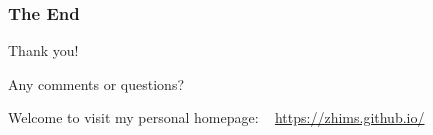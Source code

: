 \documentclass[aspectratio=2516]{beamer}
\begin{document}
\begin{frame}
\frametitle{The End}
\begin{center}
	{\Huge Thank you!}
	
	\vspace{1cm}
	
	{\Huge Any comments or questions?}
	
	\vspace{2.25cm}	
	
  {\tiny Welcome to visit my personal homepage: \ {\color{blue} \url{https://zhims.github.io/}}}
\end{center}
\end{frame}
\end{document}
